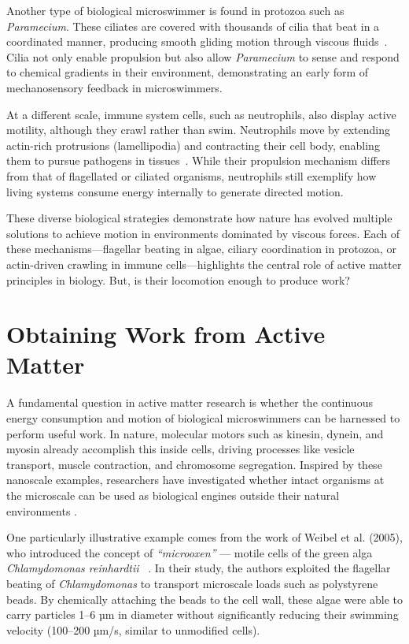 Another type of biological microswimmer is found in protozoa such as \textit{Paramecium}. These ciliates are covered with thousands of cilia that beat in a coordinated manner, producing smooth gliding motion through viscous fluids~\cite{zhang2015paramecia}. Cilia not only enable propulsion but also allow \textit{Paramecium} to sense and respond to chemical gradients in their environment, demonstrating an early form of mechanosensory feedback in microswimmers.

At a different scale, immune system cells, such as neutrophils, also display active motility, although they crawl rather than swim. Neutrophils move by extending actin-rich protrusions (lamellipodia) and contracting their cell body, enabling them to pursue pathogens in tissues~\cite{friedl2004collective}. While their propulsion mechanism differs from that of flagellated or ciliated organisms, neutrophils still exemplify how living systems consume energy internally to generate directed motion.

These diverse biological strategies demonstrate how nature has evolved multiple solutions to achieve motion in environments dominated by viscous forces. Each of these mechanisms—flagellar beating in algae, ciliary coordination in protozoa, or actin-driven crawling in immune cells—highlights the central role of active matter principles in biology. But, is their locomotion enough to produce work?

\section{Obtaining Work from Active Matter}

A fundamental question in active matter research is whether the continuous energy consumption and motion of biological microswimmers can be harnessed to perform useful work. In nature, molecular motors such as kinesin, dynein, and myosin already accomplish this inside cells, driving processes like vesicle transport, muscle contraction, and chromosome segregation. Inspired by these nanoscale examples, researchers have investigated whether intact organisms at the microscale can be used as biological engines outside their natural environments \cite{schliwa2003molecular}.

One particularly illustrative example comes from the work of Weibel et al. (2005), who introduced the concept of \textit{``microoxen''} --- motile cells of the green alga \textit{Chlamydomonas reinhardtii} ~\cite{weibel2005microoxen}. In their study, the authors exploited the flagellar beating of \textit{Chlamydomonas} to transport microscale loads such as polystyrene beads. By chemically attaching the beads to the cell wall, these algae were able to carry particles 1--6 µm in diameter without significantly reducing their swimming velocity (100–200 µm/s, similar to unmodified cells). 


